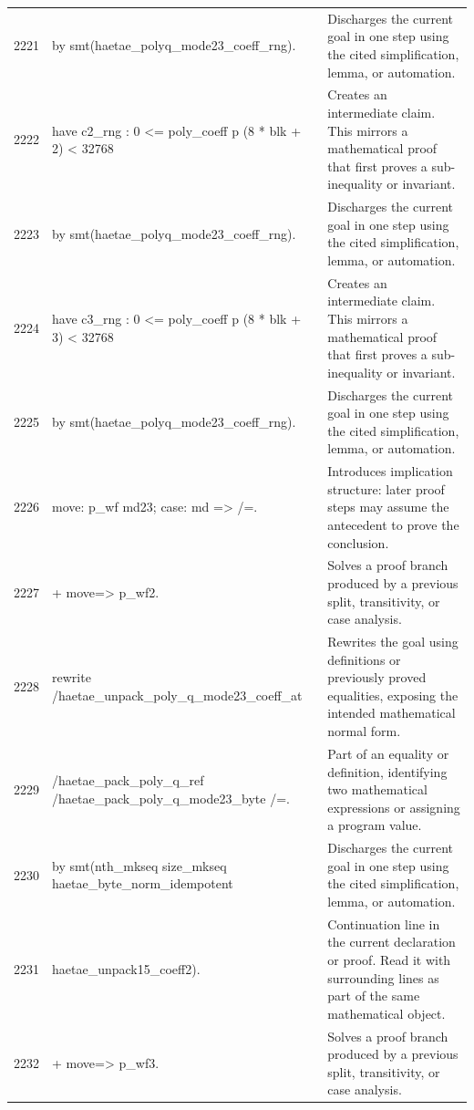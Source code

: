 \documentclass[10pt]{article}
\begin{document}
\begin{longtable}{r L{0.53\textwidth} L{0.37\textwidth}}
2221 & {\ttfamily\scriptsize   by smt(haetae\_polyq\_mode23\_coeff\_rng).} & Discharges the current goal in one step using the cited simplification, lemma, or automation. \\
2222 & {\ttfamily\scriptsize have c2\_rng : 0 <= poly\_coeff p (8 * blk + 2) < 32768} & Creates an intermediate claim.  This mirrors a mathematical proof that first proves a sub-inequality or invariant. \\
2223 & {\ttfamily\scriptsize   by smt(haetae\_polyq\_mode23\_coeff\_rng).} & Discharges the current goal in one step using the cited simplification, lemma, or automation. \\
2224 & {\ttfamily\scriptsize have c3\_rng : 0 <= poly\_coeff p (8 * blk + 3) < 32768} & Creates an intermediate claim.  This mirrors a mathematical proof that first proves a sub-inequality or invariant. \\
2225 & {\ttfamily\scriptsize   by smt(haetae\_polyq\_mode23\_coeff\_rng).} & Discharges the current goal in one step using the cited simplification, lemma, or automation. \\
2226 & {\ttfamily\scriptsize move: p\_wf md23; case: md => /=.} & Introduces implication structure: later proof steps may assume the antecedent to prove the conclusion. \\
2227 & {\ttfamily\scriptsize + move=> p\_wf2.} & Solves a proof branch produced by a previous split, transitivity, or case analysis. \\
2228 & {\ttfamily\scriptsize   rewrite /haetae\_unpack\_poly\_q\_mode23\_coeff\_at} & Rewrites the goal using definitions or previously proved equalities, exposing the intended mathematical normal form. \\
2229 & {\ttfamily\scriptsize           /haetae\_pack\_poly\_q\_ref /haetae\_pack\_poly\_q\_mode23\_byte /=.} & Part of an equality or definition, identifying two mathematical expressions or assigning a program value. \\
2230 & {\ttfamily\scriptsize   by smt(nth\_mkseq size\_mkseq haetae\_byte\_norm\_idempotent} & Discharges the current goal in one step using the cited simplification, lemma, or automation. \\
2231 & {\ttfamily\scriptsize          haetae\_unpack15\_coeff2).} & Continuation line in the current declaration or proof.  Read it with surrounding lines as part of the same mathematical object. \\
2232 & {\ttfamily\scriptsize + move=> p\_wf3.} & Solves a proof branch produced by a previous split, transitivity, or case analysis. \\

\end{longtable}
\end{document}
